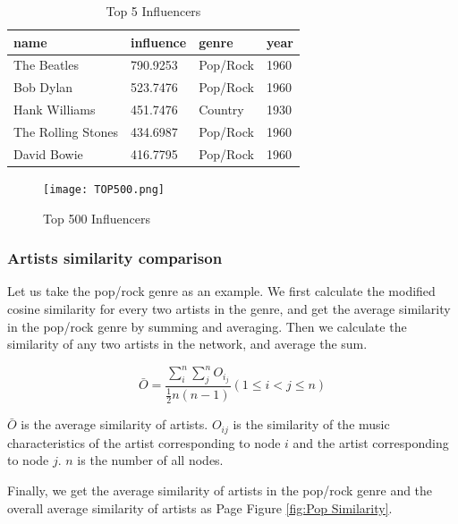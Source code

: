 \documentclass[12pt]{article}  %
\begin{document}
\begin{table}[htbp]
\caption{Top 5 Influencers}
\label{tab:Top 5 Influencers}
\centering
\begin{tabular}{llll}
\hline\hline
\rowcolor[rgb]{0.663, 0.816, 0.557}name               & influence & genre    & year \\ \hline
\rowcolor[rgb]{0.886, 0.937, 0.855} The Beatles        & 790.9253  & Pop/Rock & 1960 \\
Bob Dylan          & 523.7476  & Pop/Rock & 1960 \\
\rowcolor[rgb]{0.886, 0.937, 0.855} Hank Williams      & 451.7476  & Country  & 1930 \\
The Rolling Stones & 434.6987  & Pop/Rock & 1960 \\
\rowcolor[rgb]{0.886, 0.937, 0.855} David Bowie        & 416.7795  & Pop/Rock & 1960 \\ \hline\hline
\end{tabular}
\end{table}

\begin{figure}[htbp]
\centering
\texttt{[image: TOP500.png]}
\caption{Top 500 Influencers}\label{fig:top500}
\end{figure}

\subsubsection{Artists similarity comparison}

Let us take the pop/rock genre as an example. We first calculate the modified cosine similarity for every two artists in the genre, and get the average similarity in the pop/rock genre by summing and averaging. Then we calculate the similarity of any two artists in the network, and average the sum.


\begin{equation}
    \bar{O}=\frac{\sum_{i}^{n}\sum_{j}^{n}O_i_j }{\frac{1}{2}n\left ( n-1 \right )}\left ( 1\leq i< j \leq n\right )
\end{equation}

$\bar{O}$ is the average similarity of artists. $O_{ij}$ is the similarity of the music characteristics of the artist corresponding to node $i$ and the artist corresponding to node $j$.  $n$ is the number of all nodes.\par

Finally, we get the average similarity of artists in the pop/rock genre and the overall average similarity of artists as Page \pageref{fig:Pop Similarity} Figure \ref{fig:Pop Similarity}. 
\end{document}

